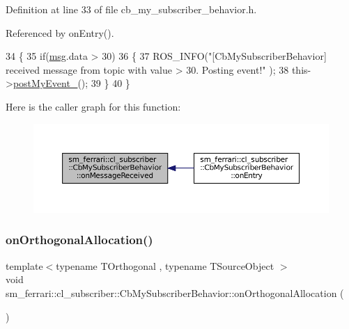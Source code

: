 Definition at line 33 of file cb\+\_\+my\+\_\+subscriber\+\_\+behavior.\+h.



Referenced by on\+Entry().


\begin{DoxyCode}
34     \{
35         \textcolor{keywordflow}{if}(\hyperlink{namespacebattery__monitor__node_ab1920c64448816edd4064e494275fdff}{msg}.data > 30)
36         \{
37             ROS\_INFO(\textcolor{stringliteral}{"[CbMySubscriberBehavior] received message from topic with value > 30. Posting event!"}
      );
38             this->\hyperlink{classsm__ferrari_1_1cl__subscriber_1_1CbMySubscriberBehavior_a54dd6633b3105bd2b1d9432ed1462ff0}{postMyEvent\_}();
39         \}
40     \}
\end{DoxyCode}
Here is the caller graph for this function\+:
\nopagebreak
\begin{figure}[H]
\begin{center}
\leavevmode
\includegraphics[width=350pt]{classsm__ferrari_1_1cl__subscriber_1_1CbMySubscriberBehavior_a9dcea2976705d72df667f747328eb7d6_icgraph}
\end{center}
\end{figure}
\mbox{\label{classsm__ferrari_1_1cl__subscriber_1_1CbMySubscriberBehavior_ab3b93bd780a1dea560e55e0a81f9dbe2}} 
\subsubsection{\texorpdfstring{on\+Orthogonal\+Allocation()}{onOrthogonalAllocation()}}
{\footnotesize\ttfamily template$<$typename T\+Orthogonal , typename T\+Source\+Object $>$ \\
void sm\+\_\+ferrari\+::cl\+\_\+subscriber\+::\+Cb\+My\+Subscriber\+Behavior\+::on\+Orthogonal\+Allocation (\begin{DoxyParamCaption}{ }\end{DoxyParamCaption})\hspace{0.3cm}{\ttfamily [inline]}}



